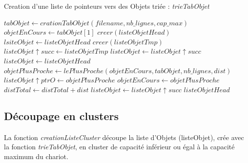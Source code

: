 \documentclass[twoside,UTF8]{EPURapport}
\begin{document}
\begin{algorithm}[H]
\caption{Creation d'une liste de pointeurs vers des Objets triée : \textit{trieTabObjet}}
\label{algo:creationTabObjet}
\begin{algorithmic}[1]

\STATE $tabObjet \leftarrow crationTabObjet(filename, nb\_lignes, cap\_max)$
\STATE $objetEnCours \leftarrow tabObjet[1]$
\STATE $creer(listeObjetHead)$
\STATE $lsiteObjet \leftarrow listeObjetHead$
	\STATE $creer(listeObjetTmp)$
	\STATE $listeObjet\uparrow succ \leftarrow listeObjetTmp$
	\STATE $listeObjet \leftarrow listeObjet\uparrow succ$
\ENDFOR
\STATE $listeObjet \leftarrow listeObjetHead$
	\STATE $objetPlusProche \leftarrow lePlusProche(objetEnCours, tabObjet,nb\_lignes, dist)$ 
	\STATE $listeObjet\uparrow ptrO \leftarrow objetPlusProche$
	\STATE $objetEnCours \leftarrow objetPlusProche$
	\STATE $distTotal \leftarrow distTotal + dist$
	\STATE $listeObjet \leftarrow listeObjet\uparrow succ$
\ENDWHILE
\RETURN $listeObjetHead$

\end{algorithmic}
\end{algorithm}

\subsection{Découpage en clusters}

\paragraph{}
La fonction \textit{creationListeCluster} découpe la liste d'Objets (listeObjet), crée avec la fonction \textit{trieTabObjet}, en cluster de capacité inférieur ou égal à la capacité maximum du chariot. 
\end{document}
